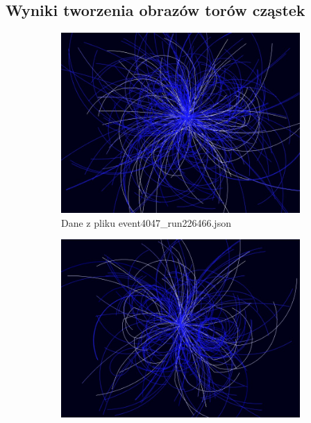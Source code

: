 \begin{appendices}
\section{Wyniki tworzenia obrazów torów cząstek}
\label{Tory}
\begin{figure}[H]
	\begin{subfigure}{0.50\textwidth}
		\centering
 		\includegraphics[width=\textwidth]{TrackScreen7.jpg}
    	\caption{Dane z pliku event4047\_run226466.json}
 		\label{rys18}
	\end{subfigure}
	\hfill
	\begin{subfigure}{0.50\textwidth}
		\centering
		\includegraphics[width=\textwidth]{TrackScreen3.jpg}

\end{subfigure}
\end{figure}
\end{appendices}
